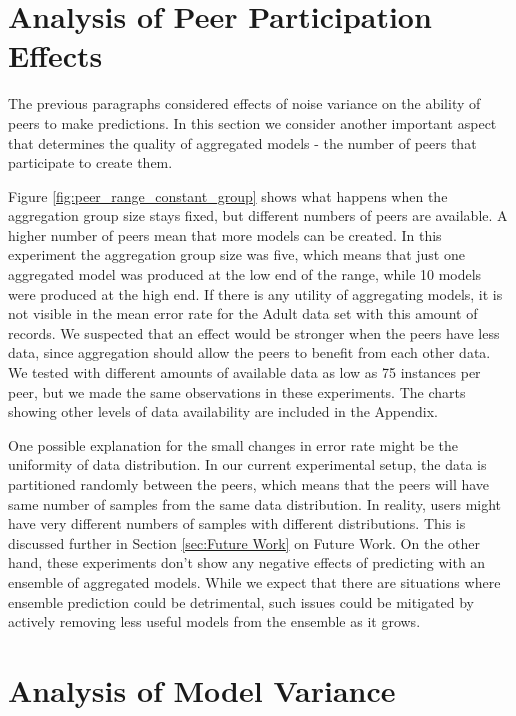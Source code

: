 \section{Analysis of Peer Participation Effects}
\label{sec:aggregation_effects}

The previous paragraphs considered effects of noise variance on the ability of peers to make predictions. In this section we consider another important aspect that determines the quality of aggregated models - the number of peers that participate to create them. 

Figure \ref{fig:peer_range_constant_group} shows what happens when the aggregation group size stays fixed, but different numbers of peers are available. A higher number of peers mean that more models can be created. In this experiment the aggregation group size was five, which means that just one aggregated model was produced at the low end of the range, while 10 models were produced at the high end. If there is any utility of aggregating models, it is not visible in the mean error rate for the Adult data set with this amount of records. We suspected that an effect would be stronger when the peers have less data, since aggregation should allow the peers to benefit from each other data. We tested with different amounts of available data as low as 75 instances per peer, but we made the same observations in these experiments. The charts showing other levels of data availability are included in the Appendix. 

One possible explanation for the small changes in error rate might be the uniformity of data distribution. In our current experimental setup, the data is partitioned randomly between the peers, which means that the peers will have same number of samples from the same data distribution. In reality, users might have very different numbers of samples with different distributions. This is discussed further in Section \ref{sec:Future Work} on Future Work. On the other hand, these experiments don't show any negative effects of predicting with an ensemble of aggregated models. While we expect that there are situations where ensemble prediction could be detrimental, such issues could be mitigated by actively removing less useful models from the ensemble as it grows.

\section{Analysis of Model Variance}

